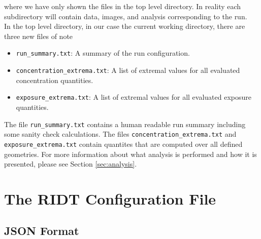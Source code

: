 \documentclass[]{article}
\def\code#1{\texttt{#1}}
\begin{document}
\noindent where we have only shown the files in the top level directory. In
reality each subdirectory will contain data, images, and analysis corresponding
to the run.\\

\noindent In the top level directory, in our case the current working directory,
there are three new files of note
\begin{itemize}
    \item \code{run\_summary.txt}: A summary of the run configuration.
    \item \code{concentration\_extrema.txt}: A list of extremal values for all
    evaluated concentration quantities.
    \item \code{exposure\_extrema.txt}: A list of extremal values for all
    evaluated exposure quantities.
\end{itemize}

\noindent The file \code{run\_summary.txt} contains a human readable run summary
including some sanity check calculations. The files
\code{concentration\_extrema.txt} and \code{exposure\_extrema.txt} contain
quantites that are computed over all defined geometries. For more information
about what analysis is performed and how it is presented, please see Section
\ref{sec:analysis}.

\section{The RIDT Configuration File}\label{sec:configfile}
\subsection{JSON Format}
\end{document}
